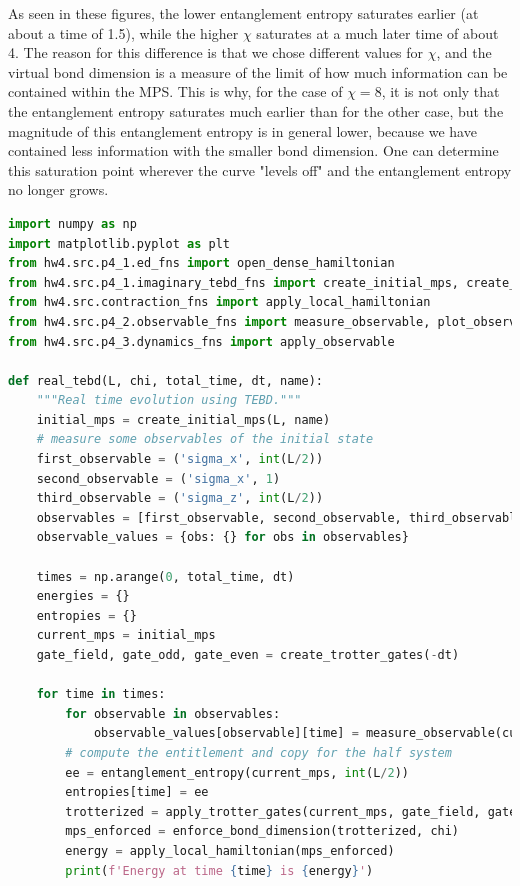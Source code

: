 \documentclass[12pt]{article}
\begin{document}
As seen in these figures, the lower entanglement entropy saturates earlier (at about a time of 1.5), while the higher $\chi$ saturates at a much later time of about 4. The reason for this difference is that we chose different values for $\chi$, and the virtual bond dimension is a measure of the limit of how much information can be contained within the MPS. This is why, for the case of $\chi=8$, it is not only that the entanglement entropy saturates much earlier than for the other case, but the magnitude of this entanglement entropy is in general lower, because we have contained less information with the smaller bond dimension. One can determine this saturation point wherever the curve "levels off" and the entanglement entropy no longer grows.
\begin{lstlisting}[language=Python]
import numpy as np
import matplotlib.pyplot as plt
from hw4.src.p4_1.ed_fns import open_dense_hamiltonian
from hw4.src.p4_1.imaginary_tebd_fns import create_initial_mps, create_trotter_gates, apply_trotter_gates, enforce_bond_dimension
from hw4.src.contraction_fns import apply_local_hamiltonian
from hw4.src.p4_2.observable_fns import measure_observable, plot_observables, entanglement_entropy, plot_entanglement_entropy, plot_combined_entanglement_entropy
from hw4.src.p4_3.dynamics_fns import apply_observable

def real_tebd(L, chi, total_time, dt, name):
    """Real time evolution using TEBD."""
    initial_mps = create_initial_mps(L, name)
    # measure some observables of the initial state
    first_observable = ('sigma_x', int(L/2))
    second_observable = ('sigma_x', 1)
    third_observable = ('sigma_z', int(L/2))
    observables = [first_observable, second_observable, third_observable]
    observable_values = {obs: {} for obs in observables}

    times = np.arange(0, total_time, dt)
    energies = {}
    entropies = {}
    current_mps = initial_mps
    gate_field, gate_odd, gate_even = create_trotter_gates(-dt)

    for time in times:
        for observable in observables:
            observable_values[observable][time] = measure_observable(current_mps, observable[0], observable[1])
        # compute the entitlement and copy for the half system
        ee = entanglement_entropy(current_mps, int(L/2))
        entropies[time] = ee
        trotterized = apply_trotter_gates(current_mps, gate_field, gate_odd, gate_even)
        mps_enforced = enforce_bond_dimension(trotterized, chi)
        energy = apply_local_hamiltonian(mps_enforced)
        print(f'Energy at time {time} is {energy}')


\end{lstlisting}
\end{document}
